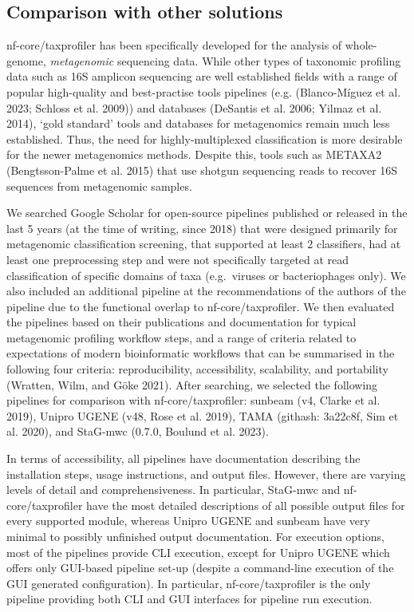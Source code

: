\documentclass[
]{article}
\begin{document}
\hypertarget{comparison-with-other-solutions}{%
\subsection{Comparison with other
solutions}\label{comparison-with-other-solutions}}

nf-core/taxprofiler has been specifically developed for the analysis of
whole-genome, \emph{metagenomic} sequencing data. While other types of
taxonomic profiling data such as 16S amplicon sequencing are well
established fields with a range of popular high-quality and
best-practise tools pipelines (e.g. (Blanco-Míguez et al. 2023; Schloss
et al. 2009)) and databases (DeSantis et al. 2006; Yilmaz et al. 2014),
`gold standard' tools and databases for metagenomics remain much less
established. Thus, the need for highly-multiplexed classification is
more desirable for the newer metagenomics methods. Despite this, tools
such as METAXA2 (Bengtsson-Palme et al. 2015) that use shotgun
sequencing reads to recover 16S sequences from metagenomic samples.

We searched Google Scholar for open-source pipelines published or
released in the last 5 years (at the time of writing, since 2018) that
were designed primarily for metagenomic classification screening, that
supported at least 2 classifiers, had at least one preprocessing step
and were not specifically targeted at read classification of specific
domains of taxa (e.g.~viruses or bacteriophages only). We also included
an additional pipeline at the recommendations of the authors of the
pipeline due to the functional overlap to nf-core/taxprofiler. We then
evaluated the pipelines based on their publications and documentation
for typical metagenomic profiling workflow steps, and a range of
criteria related to expectations of modern bioinformatic workflows that
can be summarised in the following four criteria: reproducibility,
accessibility, scalability, and portability (Wratten, Wilm, and Göke
2021). After searching, we selected the following pipelines for
comparison with nf-core/taxprofiler: sunbeam (v4, Clarke et al. 2019),
Unipro UGENE (v48, Rose et al. 2019), TAMA (githash: 3a22c8f, Sim et al.
2020), and StaG-mwc (0.7.0, Boulund et al. 2023).

In terms of accessibility, all pipelines have documentation describing
the installation steps, usage instructions, and output files. However,
there are varying levels of detail and comprehensiveness. In particular,
StaG-mwc and nf-core/taxprofiler have the most detailed descriptions of
all possible output files for every supported module, whereas Unipro
UGENE and sunbeam have very minimal to possibly unfinished output
documentation. For execution options, most of the pipelines provide CLI
execution, except for Unipro UGENE which offers only GUI-based pipeline
set-up (despite a command-line execution of the GUI generated
configuration). In particular, nf-core/taxprofiler is the only pipeline
providing both CLI and GUI interfaces for pipeline run execution.
\end{document}
